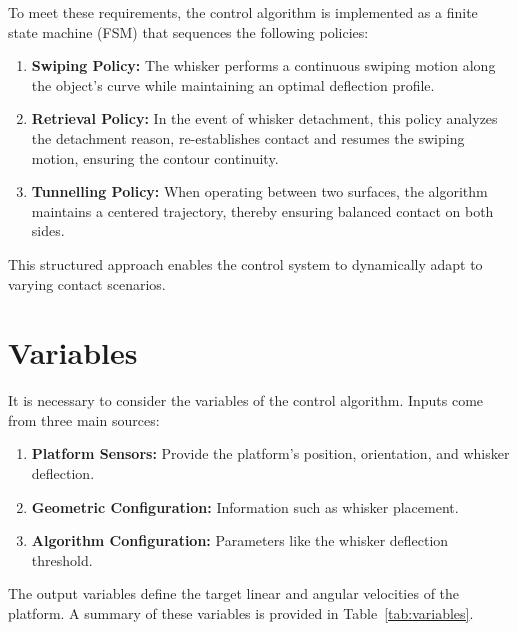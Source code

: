 \noindent To meet these requirements, the control algorithm is implemented as a finite state machine (FSM) that sequences the following policies:

\begin{enumerate}
    \item \textbf{Swiping Policy:} The whisker performs a continuous swiping motion along the object's curve while maintaining an optimal deflection profile.
    \item \textbf{Retrieval Policy:} In the event of whisker detachment, this policy analyzes the detachment reason, re-establishes contact and resumes the swiping motion, ensuring the contour continuity.
    \item \textbf{Tunnelling Policy:} When operating between two surfaces, the algorithm maintains a centered trajectory, thereby ensuring balanced contact on both sides.
\end{enumerate}

This structured approach enables the control system to dynamically adapt to varying contact scenarios.


\section{Variables}

It is necessary to consider the variables of the control algorithm.
Inputs come from three main sources:
\begin{enumerate}
    \item \textbf{Platform Sensors:} Provide the platform's position, orientation, and whisker deflection.
    \item \textbf{Geometric Configuration:} Information such as whisker placement.
    \item \textbf{Algorithm Configuration:} Parameters like the whisker deflection threshold.
\end{enumerate}
The output variables define the target linear and angular velocities of the platform.
A summary of these variables is provided in Table~\ref{tab:variables}.

\newcommand{\branch}[3]{%
    \scalebox{0.75}{$\left\{
                         \begin{array}{@{}l@{\quad}l@{}}
                             #2, & \text{if } #1,\\[0.5em]
                             #3, & \text{otherwise.}
                         \end{array}
    \right.$}%
}


